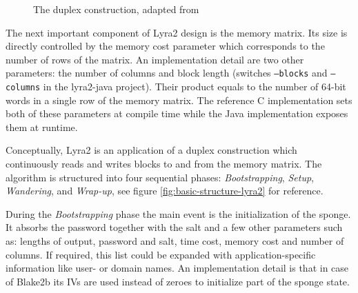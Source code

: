 \begin{figure}
  \caption{The duplex construction, adapted from \cite{bertoni:2011:duplexing,marcos:2015:lyra2}}
  \label{figure:duplex-construction}
\end{figure}

The next important component of Lyra2 design is the memory matrix. Its size is directly controlled by the memory cost parameter which corresponds to the number of rows of the matrix. An implementation detail are two other parameters: the number of columns and block length (switches \texttt{--blocks} and \texttt{--columns} in the lyra2-java project). Their product equals to the number of 64-bit words in a single row of the memory matrix. The reference C implementation sets both of these parameters at compile time while the Java implementation exposes them at runtime.

Conceptually, Lyra2 is an application of a duplex construction which continuously reads and writes blocks to and from the memory matrix. The algorithm is structured into four sequential phases: \emph{Bootstrapping}, \emph{Setup}, \emph{Wandering}, and \emph{Wrap-up}, see figure \ref{fig:basic-structure-lyra2} for reference.

During the \emph{Bootstrapping} phase the main event is the initialization of the sponge. It absorbs the password together with the salt and a few other parameters such as: lengths of output, password and salt, time cost, memory cost and number of columns. If required, this list could be expanded with application-specific information like user- or domain names. An implementation detail is that in case of Blake2b its IVs are used instead of zeroes to initialize part of the sponge state.

